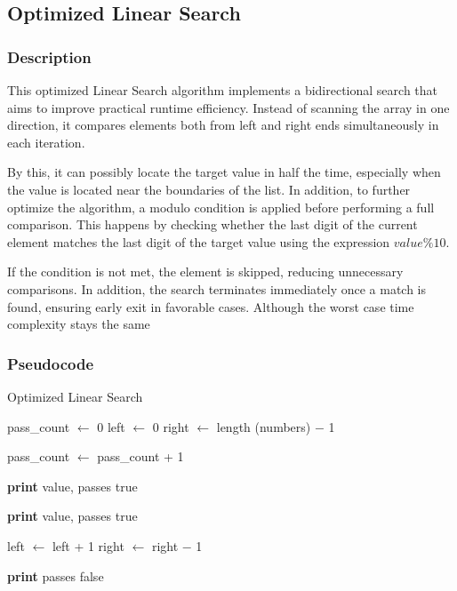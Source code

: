 \subsection{Optimized Linear Search}

\subsubsection{Description}

This optimized Linear Search algorithm implements a bidirectional search that aims to improve practical runtime efficiency. Instead of scanning the array in one direction, it compares elements both from left and right ends simultaneously in each iteration. 

By this, it can possibly locate the target value in half the time, especially when the value is located near the boundaries of the list. In addition, to further optimize the algorithm,  a modulo condition is applied before performing a full comparison. This happens by checking whether the last digit of the current element matches the last digit of the target value using the expression $value \% 10$. 

If the condition is not met, the element is skipped, reducing unnecessary comparisons. In addition, the search terminates immediately once a match is found, ensuring early exit in favorable cases. Although the worst case time complexity stays the same %

\subsubsection{Pseudocode}
\begin{algorithm}[H]
	\caption{Optimized Linear Search}
	\begin{algorithmic}
		\State{} pass\_count $\gets$ 0
		\State{} left $\gets$ 0
		\State{} right $\gets$ length (numbers) $-$ 1
		
			\State{} pass\_count $\gets$ pass\_count + 1
			
					\State{} \textbf{print} value, passes
					\State{} \Return{} true
				\EndIf{}
			\EndIf{}
			
						\State{} \textbf{print} value, passes
						\State{} \Return{} true
					\EndIf{}
				\EndIf{}
			\EndIf{}
			
			\State{} left $\gets$ left + 1
			\State{} right $\gets$ right $-$ 1
		\EndWhile{}
		
		\State{} \textbf{print} passes
		\State{} \Return{} false
	\EndProcedure{}
	\end{algorithmic}
	\end{algorithm}
	


